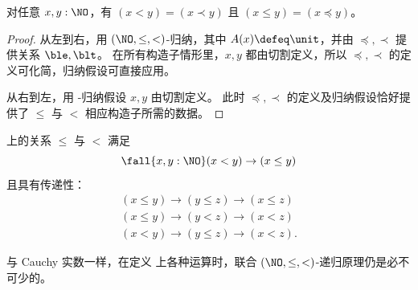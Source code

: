 \begin{thm}\label{thm:NO-encode-decode}
  对任意 $x,y:\NO$，有 $(x<y)=(x\prec y)$ 且 $(x\le y)=(x\preceq y)$。
\end{thm}
\begin{proof}
  从左到右，用 $(\NO,\le,<)$-归纳，其中 $A(x)\defeq\unit$，并由 $\preceq,\prec$ 提供关系 $\ble,\blt$。
  在所有构造子情形里，$x,y$ 都由切割定义，所以 $\preceq,\prec$ 的定义可化简，归纳假设可直接应用。

  从右到左，用 \NO-归纳假设 $x,y$ 由切割定义。
  此时 $\preceq,\prec$ 的定义及归纳假设恰好提供了 $\le$ 与 $<$ 相应构造子所需的数据。
\end{proof}

\begin{cor}\label{thm:NO-unstrict-transitive}
  \NO 上的关系 $\le$ 与 $<$ 满足
  \[ \fall{x,y:\NO} (x<y) \to (x\le y) \]
  且具有传递性：
  \begin{gather*}
    (x\le y) \to (y\le z) \to (x\le z)\\
    (x\le y) \to (y< z) \to (x< z)\\
    (x< y) \to (y\le z) \to (x< z).
  \end{gather*}
\end{cor}

与 Cauchy 实数一样，在定义 \NO 上各种运算时，联合 $(\NO,\le,<)$-递归原理仍是必不可少的。

